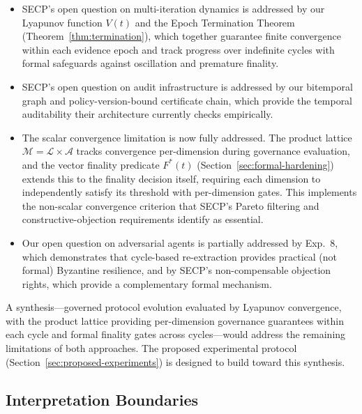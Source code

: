 \documentclass[11pt]{article}
\begin{document}
\begin{itemize}
  \item SECP's open question on multi-iteration dynamics is addressed by our Lyapunov function $V(t)$ and the Epoch Termination Theorem (Theorem~\ref{thm:termination}), which together guarantee finite convergence within each evidence epoch and track progress over indefinite cycles with formal safeguards against oscillation and premature finality.
  \item SECP's open question on audit infrastructure is addressed by our bitemporal graph and policy-version-bound certificate chain, which provide the temporal auditability their architecture currently checks empirically.
  \item The scalar convergence limitation is now fully addressed. The product lattice $\mathcal{M} = \mathcal{L} \times \mathcal{A}$ tracks convergence per-dimension during governance evaluation, and the vector finality predicate $F^*(t)$ (Section~\ref{sec:formal-hardening}) extends this to the finality decision itself, requiring each dimension to independently satisfy its threshold with per-dimension gates. This implements the non-scalar convergence criterion that SECP's Pareto filtering and constructive-objection requirements identify as essential.
  \item Our open question on adversarial agents is partially addressed by Exp.~8, which demonstrates that cycle-based re-extraction provides practical (not formal) Byzantine resilience, and by SECP's non-compensable objection rights, which provide a complementary formal mechanism.
\end{itemize}

A synthesis---governed protocol evolution evaluated by Lyapunov convergence, with the product lattice providing per-dimension governance guarantees within each cycle and formal finality gates across cycles---would address the remaining limitations of both approaches. The proposed experimental protocol (Section~\ref{sec:proposed-experiments}) is designed to build toward this synthesis.

\subsection{Interpretation Boundaries}
\end{document}
